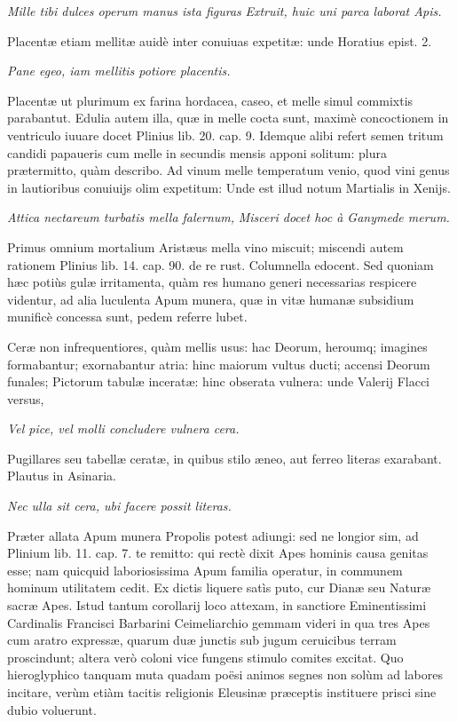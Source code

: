 \documentclass[a4paper, 11pt, oneside, polutonikogreek, latin]{article}
\begin{document}
\emph{Mille tibi dulces operum manus ista figuras}
\emph{Extruit, huic uni parca laborat Apis.}

Placentæ etiam mellitæ auidè inter conuiuas expetitæ: unde Horatius epist. 2.

\emph{Pane egeo, iam mellitis potiore placentis.}

Placentæ ut plurimum ex farina hordacea, caseo, et melle simul commixtis parabantut. Edulia autem illa, quæ in melle cocta sunt, maximè concoctionem in ventriculo iuuare docet Plinius lib. 20. cap. 9. Idemque alibi refert semen tritum candidi papaueris cum melle in secundis mensis apponi solitum: plura prætermitto, quàm describo. Ad vinum melle temperatum venio, quod vini genus in lautioribus conuiuijs olim expetitum: Unde est illud notum Martialis in Xenijs.

\emph{Attica nectareum turbatis mella falernum,}
\emph{Misceri docet hoc à Ganymede merum.}

Primus omnium mortalium Aristæus mella vino miscuit; miscendi autem rationem Plinius lib. 14. cap. 90. de re rust. Columnella edocent. Sed quoniam hæc potiùs gulæ irritamenta, quàm res humano generi necessarias respicere videntur, ad alia luculenta Apum munera, quæ in vitæ humanæ subsidium munificè concessa sunt, pedem referre lubet.

Ceræ non infrequentiores, quàm mellis usus: hac Deorum, heroumq; imagines formabantur; exornabantur atria: hinc maiorum vultus ducti; accensi Deorum funales; Pictorum tabulæ inceratæ: hinc obserata vulnera: unde Valerij Flacci versus,

\emph{Vel pice, vel molli concludere vulnera cera.}

Pugillares seu tabellæ ceratæ, in quibus stilo æneo, aut ferreo literas exarabant. Plautus in Asinaria.

\emph{Nec ulla sit cera, ubi facere possit literas.}

Præter allata Apum munera Propolis potest adiungi: sed ne longior sim, ad Plinium lib. 11. cap. 7. te remitto: qui rectè dixit Apes hominis causa genitas esse; nam quicquid laboriosissima Apum familia operatur, in communem hominum utilitatem cedit. Ex dictis liquere satìs puto, cur Dianæ seu Naturæ sacræ Apes. Istud tantum corollarij loco attexam, in sanctiore Eminentissimi Cardinalis Francisci Barbarini Ceimeliarchio gemmam videri in qua tres Apes cum aratro expressæ, quarum duæ junctis sub jugum ceruicibus terram proscindunt; altera verò coloni vice fungens stimulo comites excitat. Quo hieroglyphico tanquam muta quadam poësi animos segnes non solùm ad labores incitare, verùm etiàm tacitis religionis Eleusinæ præceptis instituere prisci sine dubio voluerunt.
\clearpage
\end{document}
